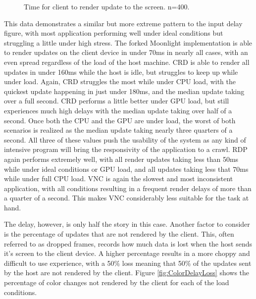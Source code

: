 \begin{figure}[h]
  \caption[Color Delay Data]{Time for client to render update to the screen. n=400.}
  \label{fig:ColorDelay}
\end{figure}

This data demonstrates a similar but more extreme pattern to the input delay figure, with most application performing well under ideal conditions but struggling a little under high stress.
The forked Moonlight implementation is able to render updates on the client device in under 70ms in nearly all cases, with an even spread regardless of the load of the host machine.
CRD is able to render all updates in under 160ms while the host is idle, but struggles to keep up while under load.
Again, CRD struggles the most while under CPU load, with the quickest update happening in just under 180ms, and the median update taking over a full second.
CRD performs a little better under GPU load, but still experiences much high delays with the median update taking over half of a second.
Once both the CPU and the GPU are under load, the worst of both scenarios is realized as the median update taking nearly three quarters of a second.
All three of these values push the usability of the system as any kind of intensive program will bring the responsivity of the application to a crawl.
RDP again performs extremely well, with all render updates taking less than 50ms while under ideal conditions or GPU load, and all updates taking less that 70ms while under full CPU load.
VNC is again the slowest and most inconsistent application, with all conditions resulting in a frequent render delays of more than a quarter of a second.
This makes VNC considerably less suitable for the task at hand.

The delay, however, is only half the story in this case.
Another factor to consider is the percentage of updates that are not rendered by the client.
This, often referred to as dropped frames, records how much data is lost when the host sends it's screen to the client device.
A higher percentage results in a more choppy and difficult to use experience, with a 50\% loss meaning that 50\% of the updates sent by the host are not rendered by the client.
Figure \ref{fig:ColorDelayLoss} shows the percentage of color changes not rendered by the client for each of the load conditions.

